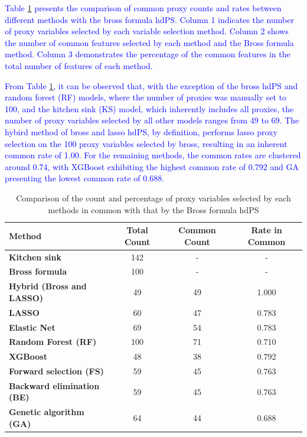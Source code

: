 \documentclass[sn-vancouver,Numbered,lineno,pdflatex]{sn-jnl}
\begin{document}
\textcolor{blue}{Table \ref{tab:proxy-common-pct-bross} presents the comparison of common proxy counts and rates between different methods with the bross formula hdPS. Column 1 indicates the number of proxy variables selected by each variable selection method. Column 2 shows the number of common features selected by each method and the Bross formula method. Column 3 demonstrates the percentage of the common features in the total number of features of each method.}

\textcolor{blue}{From Table \ref{tab:proxy-common-pct-bross}, it can be observed that, with the exception of the bross hdPS and random forest (RF) models, where the number of proxies was manually set to 100, and the kitchen sink (KS) model, which inherently includes all proxies, the number of proxy variables selected by all other models ranges from 49 to 69. The hybird method of bross and lasso hdPS, by definition, performs lasso proxy selection on the 100 proxy variables selected by bross, resulting in an inherent common rate of 1.00. For the remaining methods, the common rates are clustered around 0.74, with XGBoost exhibiting the highest common rate of 0.792 and GA presenting the lowest common rate of 0.688.}

\begin{table}[htbp]
\centering
\caption{Comparison of the count and percentage of proxy variables selected by each methods in common with that by the Bross formula hdPS}
\label{tab:proxy-common-pct-bross}
\begin{tabular}{lccc}
\toprule
\textbf{Method} & \textbf{Total Count} & \textbf{Common Count} & \textbf{Rate in Common} \\ 
\midrule
\textbf{Kitchen sink} & 142 & - & - \\
\textbf{Bross formula} & 100 & - & - \\
\textbf{Hybrid (Bross and LASSO)} & 49 & 49 & 1.000 \\
\textbf{LASSO} & 60 & 47 & 0.783 \\
\textbf{Elastic Net} & 69 & 54 & 0.783 \\
\textbf{Random Forest (RF)} & 100 & 71 & 0.710 \\  
\textbf{XGBoost} & 48 & 38 & 0.792 \\
\textbf{Forward selection (FS)} & 59 & 45 & 0.763 \\
\textbf{Backward elimination (BE)} & 59 & 45 & 0.763 \\
\textbf{Genetic algorithm (GA)} & 64 & 44 & 0.688 \\
\bottomrule
\end{tabular}
\end{table}
\end{document}
